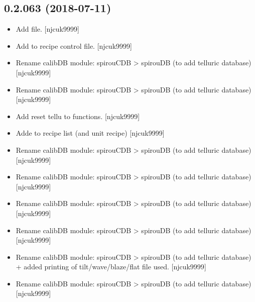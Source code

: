 \documentclass[a4paper,10pt,english]{report}
\begin{document}
\subsection{0.2.063 (2018-07-11)}
\label{\detokenize{misc/changelog:id397}}\begin{itemize}
\item {} 
Add  file. {[}njcuk9999{]}

\item {} 
Add  to recipe control file. {[}njcuk9999{]}

\item {} 
Rename calibDB module: spirouCDB \textendash{}\textgreater{} spirouDB (to add telluric
database) {[}njcuk9999{]}

\item {} 
Rename calibDB module: spirouCDB \textendash{}\textgreater{} spirouDB (to add telluric
database) {[}njcuk9999{]}

\item {} 
Add reset tellu to  functions. {[}njcuk9999{]}

\item {} 
Adde  to recipe list (and unit recipe) {[}njcuk9999{]}

\item {} 
Rename calibDB module: spirouCDB \textendash{}\textgreater{} spirouDB (to add telluric
database) {[}njcuk9999{]}

\item {} 
Rename calibDB module: spirouCDB \textendash{}\textgreater{} spirouDB (to add telluric
database) {[}njcuk9999{]}

\item {} 
Rename calibDB module: spirouCDB \textendash{}\textgreater{} spirouDB (to add telluric
database) {[}njcuk9999{]}

\item {} 
Rename calibDB module: spirouCDB \textendash{}\textgreater{} spirouDB (to add telluric
database) {[}njcuk9999{]}

\item {} 
Rename calibDB module: spirouCDB \textendash{}\textgreater{} spirouDB (to add telluric
database) + added printing of tilt/wave/blaze/flat file used.
{[}njcuk9999{]}

\item {} 
Rename calibDB module: spirouCDB \textendash{}\textgreater{} spirouDB (to add telluric
database) {[}njcuk9999{]}


\end{itemize}
\end{document}
